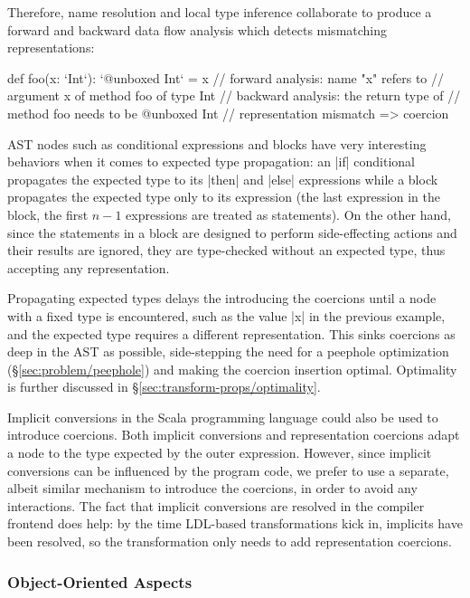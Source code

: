 Therefore, name resolution and local type inference collaborate to produce a forward and backward data flow analysis which detects mismatching representations:

\begin{lstlisting-nobreak}
 def foo(x: `Int`):  `@unboxed Int` =
   x // forward analysis: name "x" refers to
      //     argument x of method foo of type Int
      // backward analysis: the return type of
      //     method foo needs to be @unboxed Int
      // representation mismatch => coercion
\end{lstlisting-nobreak}

AST nodes such as conditional expressions and blocks have very interesting behaviors when it comes to expected type propagation: an |if| conditional propagates the expected type to its |then| and |else| expressions while a block propagates the expected type only to its expression (the last expression in the block, the first $n-1$ expressions are treated as statements). On the other hand, since the statements in a block are designed to perform side-effecting actions and their results are ignored, they are type-checked without an expected type, thus accepting any representation.

Propagating expected types delays the introducing the coercions until a node with a fixed type is encountered, such as the value |x| in the previous example, and the expected type requires a different representation. This sinks coercions as deep in the AST as possible, side-stepping the need for a peephole optimization (\S\ref{sec:problem/peephole}) and making the coercion insertion optimal. Optimality is further discussed in \S\ref{sec:transform-props/optimality}.

Implicit conversions in the Scala programming language could also be used to introduce coercions. Both implicit conversions and representation coercions adapt a node to the type expected by the outer expression. However, since implicit conversions can be influenced by the program code, we prefer to use a separate, albeit similar mechanism to introduce the coercions, in order to avoid any interactions. The fact that implicit conversions are resolved in the compiler frontend does help: by the time LDL-based transformations kick in, implicits have been resolved, so the transformation only needs to add representation coercions.

\subsubsection*{Object-Oriented Aspects}
\label{subsec:coerce-object-oriented}


